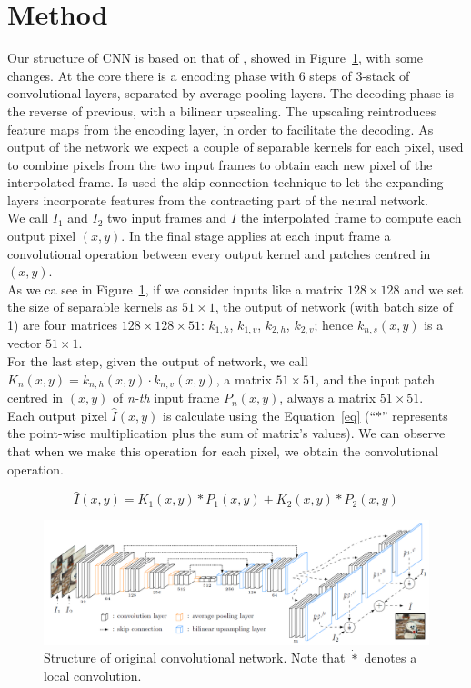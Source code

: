 \documentclass[11pt, a4paper]{article}
\begin{document}
	\section{Method}
	Our structure of CNN is based on that of \cite{mainpaper}, showed in Figure~\ref{original-net}, with some changes. At the core there is a encoding phase with 6 steps of 3-stack of convolutional layers, separated by average pooling layers. The decoding phase is the reverse of previous, with a bilinear upscaling. The upscaling reintroduces feature maps from the encoding layer, in order to facilitate the decoding. As output of the network we expect a couple of separable kernels for each pixel, used to combine pixels from the two input frames to obtain each new pixel of the interpolated frame. Is used the skip connection technique to let the expanding layers incorporate features from the contracting part of the neural network.\\
	We call $I_1$ and $I_2$ two input frames and $\hat{I}$ the interpolated frame to compute each output pixel $(x,y)$. In the final stage applies at each input frame a convolutional operation between every output kernel and patches centred in $(x,y)$.\\
	As we ca see in Figure~\ref{original-net}, if we consider inputs like a matrix $128\times128$ and we set the size of separable kernels as $51\times1$, the output of network (with batch size of 1) are four matrices $128\times128\times51$: $k_{1,h}$, $k_{1,v}$, $k_{2,h}$, $k_{2,v}$; hence $k_{n,s}(x,y)$ is a vector $51\times1$.\\
	For the last step, given the output of network, we call $K_n(x,y) = k_{n,h}(x,y) \cdot k_{n,v}(x,y)$, a matrix $51\times51$, and the input patch centred in $(x,y)$ of \textit{n-th} input frame $P_n(x,y)$, always a matrix $51\times51$.\\
	Each output pixel $\hat{I}(x,y)$ is calculate using the Equation~\ref{eq} (``$*$'' represents the point-wise multiplication plus the sum of matrix's values). We can observe that when we make this operation for each pixel, we obtain the convolutional operation. 
	
	\begin{equation}
		\hat{I}(x,y) = K_1(x,y) * P_1(x,y) + K_2(x,y) * P_2(x,y)
		\label{eq}
	\end{equation}
	
	\begin{figure}
		\centering
		\includegraphics[width=0.6\textheight]{net_structure}
		\caption{Structure of original convolutional network. Note that $\dot{*}$ denotes a local convolution.}
		\label{original-net}
	\end{figure}
\end{document}
